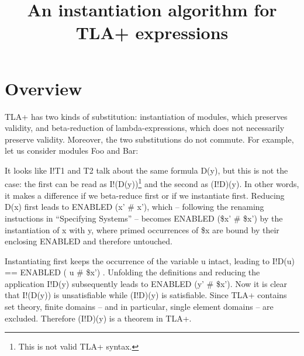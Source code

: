 \documentclass[a4paper]{article}
\title{An instantiation algorithm for TLA+ expressions}
\newcommand{\tlaplus}[0]{{TLA+}}
\newcommand{\tla}[1]{#1}
\begin{document}
\maketitle

\section{Overview}
\label{sec:overview}
\tlaplus{} has two kinds of substitution: instantiation of modules, which
 preserves validity, and beta-reduction of lambda-expressions, which does not
 necessarily preserve validity. Moreover, the two substitutions do not commute.
 For example, let us consider modules Foo and Bar:

\begin{parcolumns}{2}
\end{parcolumns}

\vspace{2mm}
\noindent
It looks like \tla{I!T1} and \tla{T2} talk about the same formula \tla{D(y)},
 but this is not the case: the first can be read as \tla{I!(D(y))}\footnote{This
 is not valid \tlaplus{} syntax.} and the second as \tla{(I!D)(y)}. In other
 words, it makes a difference if we beta-reduce first or if we instantiate
 first. Reducing D(x) first leads to \tla{ENABLED (x' \# x')}, which -- following the
 renaming instuctions in ``Specifying Systems'' -- becomes \tla{ENABLED (\$x'
 \# \$x')} by the instantiation of \tla{x} with \tla{y}, where primed
 occurrences of \tla{\$x} are bound by their enclosing ENABLED and therefore
 untouched.

Instantiating first keeps the occurrence of the  variable \tla{u} intact,
 leading to \tla{I!D(u) == ENABLED ( u \# \$x') }. Unfolding the definitions and
 reducing the application \tla{I!D(y)} subsequently leads to
 \tla{ENABLED (y' \# \$x')}. Now it is clear that \tla{I!(D(y))} is
 unsatisfiable while \tla{(I!D)(y)} is satisfiable. Since \tlaplus{}
 contains set theory, finite domains -- and in particular, single element
 domains -- are excluded. Therefore \tla{(I!D)(y)} is a theorem in \tlaplus{}.
\end{document}
